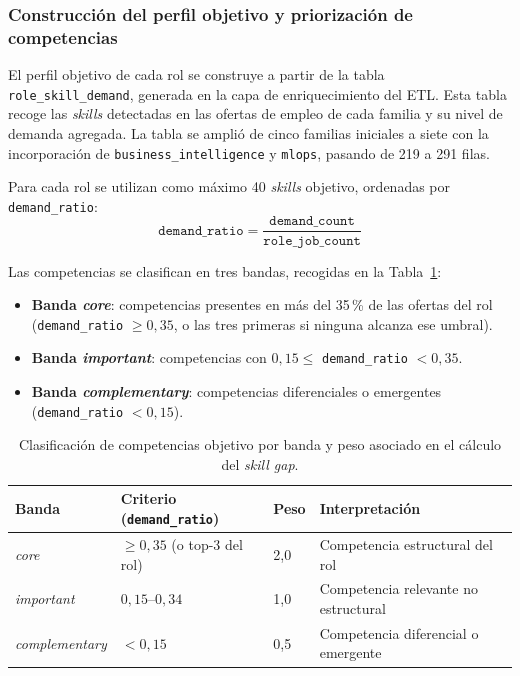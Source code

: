\subsubsection{Construcción del perfil objetivo y priorización de competencias}
\label{subsubsec:perfil_objetivo}
El perfil objetivo de cada rol se construye a partir de la tabla \texttt{role\_skill\_demand}, generada en la capa de enriquecimiento del ETL. Esta tabla recoge las \textit{skills} detectadas en las ofertas de empleo de cada familia y su nivel de demanda agregada. La tabla se amplió de cinco familias iniciales a siete con la incorporación de \texttt{business\_intelligence} y \texttt{mlops}, pasando de 219 a 291 filas.

Para cada rol se utilizan como máximo 40 \textit{skills} objetivo, ordenadas por \texttt{demand\_ratio}:
\[
  \texttt{demand\_ratio} = \frac{\texttt{demand\_count}}{\texttt{role\_job\_count}}
\]

Las competencias se clasifican en tres bandas, recogidas en la Tabla~\ref{tab:tabla3_7}:
\begin{itemize}
  \item \textbf{Banda \textit{core}}: competencias presentes en más del 35\,\% de las ofertas del rol (\texttt{demand\_ratio} $\geq 0{,}35$, o las tres primeras si ninguna alcanza ese umbral).
  \item \textbf{Banda \textit{important}}: competencias con $0{,}15 \leq$ \texttt{demand\_ratio} $< 0{,}35$.
  \item \textbf{Banda \textit{complementary}}: competencias diferenciales o emergentes (\texttt{demand\_ratio} $< 0{,}15$).
\end{itemize}

\begin{table}[H]
  \caption{Clasificación de competencias objetivo por banda y peso asociado en el cálculo del \textit{skill gap}.}
  \label{tab:tabla3_7}
  \centering
  \footnotesize
  \begin{tabular}{|p{2.5cm}|p{4.5cm}|p{2.0cm}|p{4.5cm}|}
    \hline
    \rowcolor{gray!15}
    \textbf{Banda} & \textbf{Criterio (\texttt{demand\_ratio})} & \textbf{Peso} & \textbf{Interpretación} \\
    \hline
    \textit{core}          & $\geq 0{,}35$ (o top-3 del rol)  & 2{,}0 & Competencia estructural del rol \\
    \hline
    \textit{important}     & $0{,}15$--$0{,}34$               & 1{,}0 & Competencia relevante no estructural \\
    \hline
    \textit{complementary} & $< 0{,}15$                       & 0{,}5 & Competencia diferencial o emergente \\
    \hline
  \end{tabular}
\end{table}

